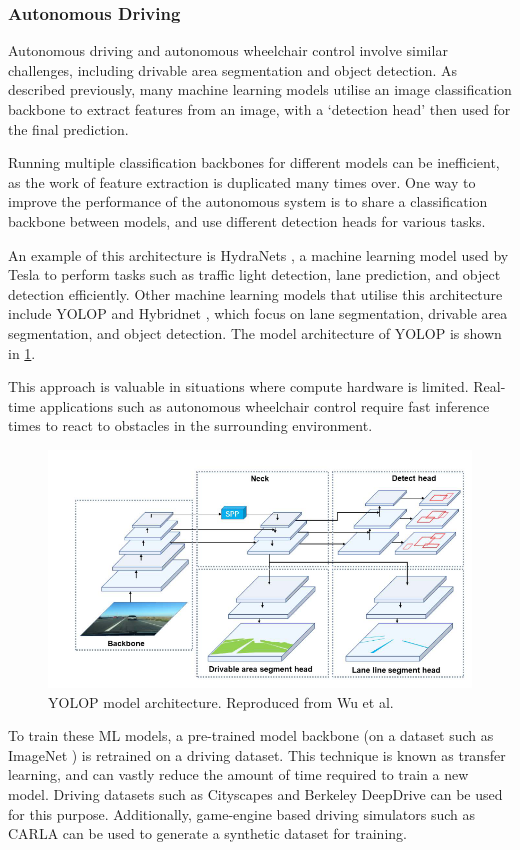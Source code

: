 \subsubsection{Autonomous Driving}
Autonomous driving and autonomous wheelchair control involve similar challenges,
including drivable area segmentation and object detection. As described previously, many machine learning
models utilise an image classification backbone to extract features from an image, with a `detection head'
then used for the final prediction.

Running multiple classification backbones for different models can be inefficient, as
the work of feature extraction is duplicated many times over. One way to improve the performance
of the autonomous system is to share a classification backbone between models, and use different detection
heads for various tasks.

An example of this architecture is HydraNets \cite{karpathyTeslaAIDay2021}, a machine learning model used by
Tesla to perform tasks such as traffic light detection, lane prediction, and object detection efficiently.
Other machine learning models that utilise this architecture include YOLOP \cite{wuYOLOPYouOnly2021} and
Hybridnet \cite{vuHybridNetsEndtoEndPerception2022}, which focus on lane segmentation, drivable area segmentation,
and object detection. The model architecture of YOLOP is shown in \cref{fig:yolop}.

This approach is valuable in situations where compute hardware is limited. Real-time applications such as
autonomous wheelchair control require fast inference times to react to obstacles in the surrounding environment.

\begin{figure}[b]
    \centering
    \includegraphics[width=0.65\linewidth]{images/yolop.png}
    \caption{YOLOP model architecture. Reproduced from Wu et al. \cite{wuYOLOPYouOnly2021}}
    \label{fig:yolop}
\end{figure}

To train these ML models, a pre-trained model backbone (on a dataset such as ImageNet \cite{jiadengImageNetLargescaleHierarchical2009})
is retrained on a driving dataset. This technique is known as transfer learning, and can vastly reduce the amount of time required
to train a new model.
Driving datasets such as Cityscapes \cite{cordtsCityscapesDatasetSemantic2016} and Berkeley DeepDrive \cite{yuBDD100KDiverseDriving2018}
can be used for this purpose. Additionally, game-engine based driving simulators such as CARLA \cite{dosovitskiyCARLAOpenUrban2017} can be used to generate a
synthetic dataset for training.

